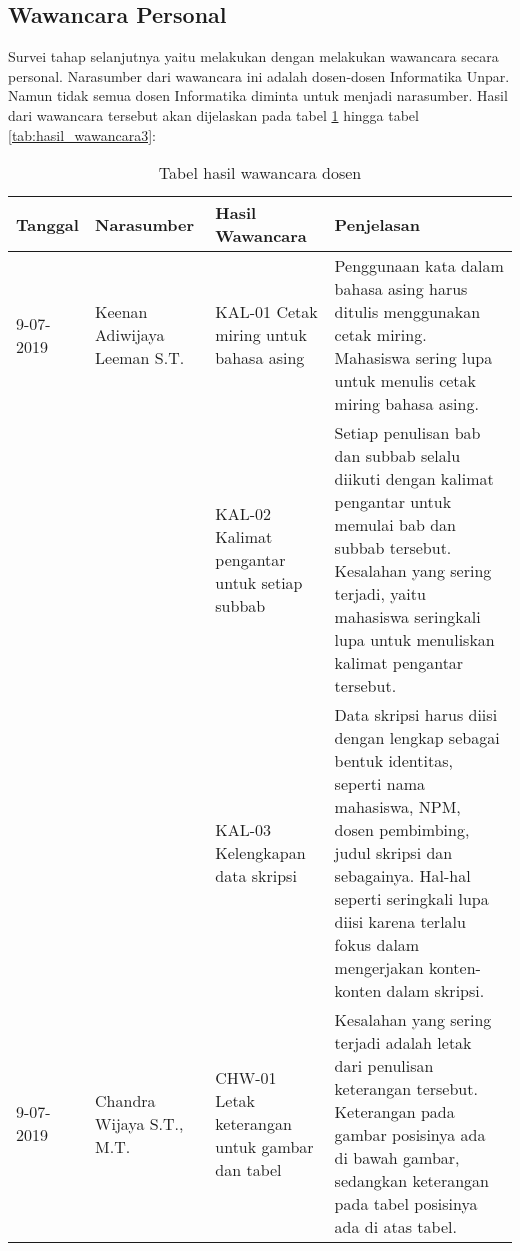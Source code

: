 \subsection{Wawancara Personal}
Survei tahap selanjutnya yaitu melakukan dengan melakukan wawancara secara personal. Narasumber dari wawancara ini adalah dosen-dosen Informatika Unpar. Namun tidak semua dosen Informatika diminta untuk menjadi narasumber. Hasil dari wawancara tersebut akan dijelaskan pada tabel \ref{tab:hasil_wawancara1} hingga tabel \ref{tab:hasil_wawancara3}:

\begin{table}[H]
	\renewcommand{\arraystretch}{1.5}
	\caption {Tabel hasil wawancara dosen} \label{tab:hasil_wawancara1}
	\begin{center}
		\begin{tabular}{|p{2 cm}|>{\raggedright} p{3.5 cm}| p{4 cm}| p{5 cm}|}
		\hline
		Tanggal & Narasumber & Hasil Wawancara & Penjelasan \\ 
		\hline
		9-07-2019 & Keenan Adiwijaya Leeman S.T. & KAL-01 \newline Cetak miring untuk bahasa asing & Penggunaan kata dalam bahasa asing harus ditulis menggunakan cetak miring. Mahasiswa sering lupa untuk menulis cetak miring bahasa asing. \newline \\ 
		\hline
		 & & KAL-02 \newline Kalimat pengantar untuk setiap subbab & Setiap penulisan bab dan subbab selalu diikuti dengan kalimat pengantar untuk memulai bab dan subbab tersebut. Kesalahan yang sering terjadi, yaitu mahasiswa seringkali lupa untuk menuliskan kalimat pengantar tersebut. \newline \\ 
		\hline 
		 & & KAL-03 \newline Kelengkapan data skripsi & Data skripsi harus diisi dengan lengkap sebagai bentuk identitas, seperti nama mahasiswa, NPM, dosen pembimbing, judul skripsi dan sebagainya. Hal-hal seperti seringkali lupa diisi karena terlalu fokus dalam mengerjakan konten-konten dalam skripsi. \newline \\
		\hline
		9-07-2019 & Chandra Wijaya S.T., M.T. & CHW-01 \newline Letak keterangan untuk gambar dan tabel & Kesalahan yang sering terjadi adalah letak dari penulisan keterangan tersebut. Keterangan pada gambar posisinya ada di bawah gambar, sedangkan keterangan pada tabel posisinya ada di atas tabel. \newline \\ 
		\hline
		\end{tabular}
	\end{center}
\end{table}

